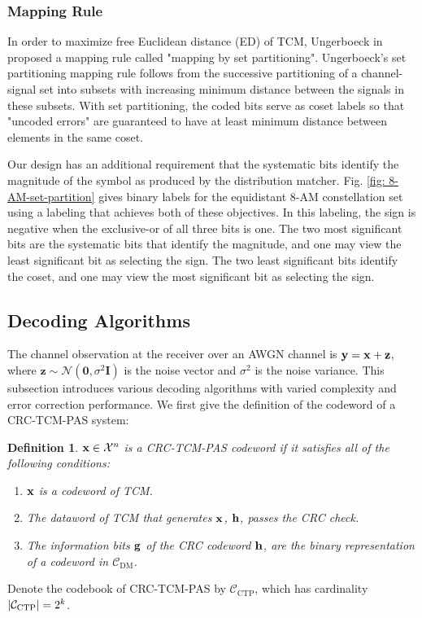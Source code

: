 \documentclass [PhD] {uclathes}
\newtheorem{definition}{Definition}
\begin{document}
\subsubsection{Mapping Rule}
In order to maximize free Euclidean distance (ED) of TCM, Ungerboeck in \cite{ungerboeck1982channel} proposed a mapping rule called "mapping by set partitioning". 
Ungerboeck's set partitioning mapping rule follows from the successive partitioning of a channel-signal set into subsets with increasing minimum distance between the signals in these subsets.  With set partitioning, the coded bits serve as coset labels so that "uncoded errors" are guaranteed to have at least minimum distance between elements in the same coset.

Our design has an additional requirement that the systematic bits identify the magnitude of the symbol as produced by the distribution matcher.
Fig. \ref{fig: 8-AM-set-partition} gives binary labels for the equidistant 8-AM constellation set using a labeling that achieves both of these objectives.  In this labeling, the sign is negative when the exclusive-or of all three bits is one. The two most significant bits are the systematic bits that identify the magnitude, and one may view the least significant bit as selecting the sign.  The two least significant bits identify the coset, and one may view the most significant bit as selecting the sign. 

\subsection{Decoding Algorithms}
The channel observation at the receiver over an AWGN channel is  $\mathbf{y}=\mathbf{x}+\mathbf{z}$, where $\mathbf{z}\sim\mathcal{N}(\mathbf{0},\sigma^2\mathbf{I})$ is the noise vector and $\sigma^2$ is the noise variance. This subsection introduces various decoding algorithms with varied complexity and error correction performance.
We first give the definition of the codeword of a CRC-TCM-PAS system:

\begin{definition}
    $\mathbf{x}\in\mathcal{X}^n$ is a \textit{CRC-TCM-PAS codeword} if it satisfies all of the following conditions:
    \begin{enumerate}
        \item $\mathbf{x}$ is a codeword of TCM.
        \item The dataword of TCM that generates $\mathbf{x}$, $\mathbf{h}$, passes the CRC check.
        \item The information bits $\mathbf{g}$ of the CRC codeword $\mathbf{h}$, are the binary representation of a codeword in $\mathcal{C_{\mathrm{DM}}}$.
    \end{enumerate}
\end{definition}
Denote the codebook of CRC-TCM-PAS by $\mathcal{C}_{\mathrm{CTP}}$, which has cardinality $|\mathcal{C}_{\mathrm{CTP}}|=2^k$. 
\end{document}
